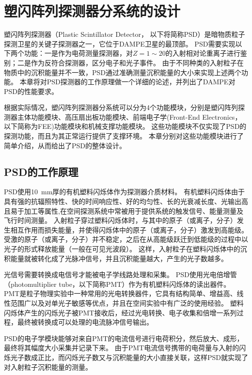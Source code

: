 \chapter{塑闪阵列探测器分系统的设计}
\label{ch:psd_description}
塑闪阵列探测器（Plastic Scintillator Detector， 以下将简称PSD）是暗物质粒子探测卫星的关键子探测器之一，它位于DAMPE卫星的最顶部。
PSD需要实现以下两个功能：一是作为电荷测量探测器，对$Z=1\sim20$的入射相对论重离子进行鉴别；二是作为反符合探测器，区分电子和光子事件。
由于不同种类的入射粒子在物质中的沉积能量并不一致，PSD通过准确测量沉积能量的大小来实现上述两个功能。
本章将对PSD探测器的工作原理做一个详细的论述，并列出了DAMPE对PSD的性能要求。

根据实际情况，塑闪阵列探测器分系统可以分为4个功能模块，分别是塑闪阵列探测器主体功能模块、高压扇出板功能模块、前端电子学(Front-End Electronics，以下简称为FEE)功能模块和机械支撑功能模块。
这些功能模块不仅实现了PSD的探测功能，而且为其正常运行提供了支撑环境。
本章分别对这些功能模块进行了简单介绍，从而给出了PSD的整体设计。

\section{PSD的工作原理}
\label{sec:psd_principle}
PSD使用\SI{10}{\milli\meter}厚的有机塑料闪烁体作为探测器介质材料。
有机塑料闪烁体由于具有强的抗辐照特性、快的时间响应性、好的均匀性、长的光衰减长度、光输出高且易于加工等属性,在空间探测系统中常被用于提供系统的触发信号、能量测量及飞行时间测量。
入射粒子穿过塑料闪烁体时，与其中的原子（或离子，分子）发生相互作用而损失能量，并使得闪烁体中的原子（或离子，分子）激发到高能级。
受激的原子（或离子，分子）并不稳定，之后在从高能级跃迁到低能级的过程中以光子的形式释放能量（一般在可见光波段）。
这样，入射粒子在塑料闪烁体中的沉积能量就被转化成了光脉冲信号，并且沉积能量越大，产生的光子数越多。

光信号需要转换成电信号才能被电子学线路处理和采集。
PSD使用光电倍增管（photomultiplier tube，以下简称PMT）作为有机塑料闪烁体的读出器件。
PMT是粒子物理实验中一种常用的光电转换器件，它具有结构简单、增益高、线性范围广以及对单光子敏感等优点，并且在空间实验中有广泛的使用经验。
塑料闪烁体产生的闪烁光子被PMT接收后，经过光电转换、电子收集和倍增一系列过程，最终被转换成可以处理的电流脉冲信号输出。

PSD的电子学模块能够对来自PMT的电流信号进行电荷积分，然后放大、成形，最终将其幅度大小采集并记录下来。
由于PMT电流信号携带的电荷量与入射的闪烁光子数成正比，而闪烁光子数又与沉积能量的大小直接关联，这样PSD就实现了对入射粒子沉积能量的测量。

